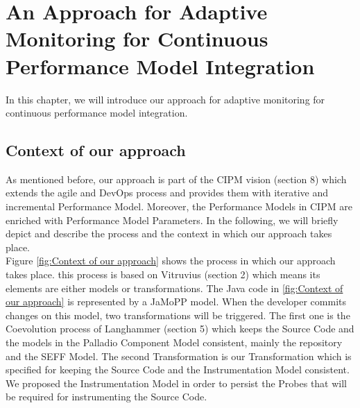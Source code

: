 

\chapter{An Approach for Adaptive Monitoring for Continuous Performance Model Integration}
\label{ch:An Approach for Adaptive Monitoring for Continuous Performance Model Integration}
In this chapter, we will introduce our approach for adaptive monitoring for continuous performance model integration. 

\section{Context of our approach}
\label{sec: Context of our approach}
As mentioned before, our approach is part of the CIPM vision (section 8) which extends the agile and DevOps process and provides them with iterative and incremental Performance Model. Moreover, the Performance Models in CIPM are enriched with Performance Model Parameters. In the following, we will briefly depict and describe the process and the context in which our approach takes place.\\

Figure \ref{fig:Context of our approach} shows the process in which our approach takes place. this process is based on Vitruvius (section 2) which means its elements are either models or transformations. The Java code in \ref{fig:Context of our approach} is represented by a JaMoPP model. When the developer commits changes on this model, two transformations will be triggered. The first one is the Coevolution process of Langhammer (section 5) which keeps the Source Code and the models in the Palladio Component Model consistent, mainly the repository and the SEFF Model. The second Transformation is our Transformation which is specified for keeping the Source Code and the Instrumentation Model consistent. We proposed the Instrumentation Model in order to persist the Probes that will be required for instrumenting the Source Code.\\

